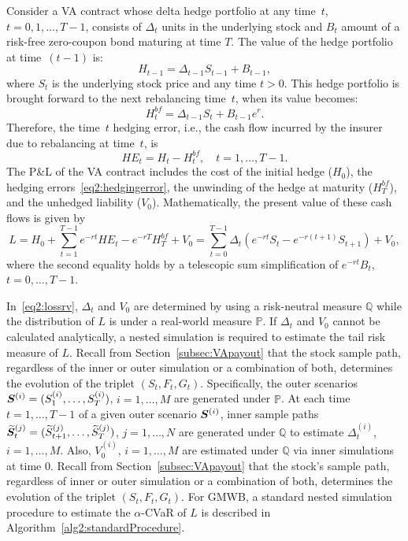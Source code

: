 Consider a VA contract whose delta hedge portfolio at any time~$t$, $t=0,1,\ldots,T-1$, consists of $\Delta_t$ units in the underlying stock and $B_t$ amount of a risk-free zero-coupon bond maturing at time $T$.
The value of the hedge portfolio at time~$(t-1)$ is:
\begin{equation*}
    H_{t-1} = \Delta_{t-1} S_{t-1} + B_{t-1},
\end{equation*}
where $S_t$ is the underlying stock price and any time $t>0$.
This hedge portfolio is brought forward to the next rebalancing time~$t$, when its value becomes:
\begin{equation*}
    H_{t}^{bf} = \Delta_{t-1} S_{t} + B_{t-1}e^{r}.
\end{equation*}
Therefore, the time~$t$ hedging error, i.e., the cash flow incurred by the insurer due to rebalancing at time~$t$, is
\begin{equation}\label{eq2:hedgingerror}
    HE_t = H_t - H^{bf}_t, \quad t=1,\ldots, T-1.
\end{equation}
The P\&L of the VA contract includes the cost of the initial hedge ($H_0$), the hedging errors~\eqref{eq2:hedgingerror}, the unwinding of the hedge at maturity ($H^{bf}_T$), and the unhedged liability ($V_0$).
Mathematically, the present value of these cash flows is given by
\begin{equation}\label{eq2:lossrv}
L = H_0 + \sum_{t=1}^{T-1} e^{-rt} HE_t - e^{-rT} H^{bf}_T + V_0 = \sum_{t=0}^{T-1}\Delta_t (e^{-rt}S_t - e^{-r(t+1)}S_{t+1}) + V_0,
\end{equation}
where the second equality holds by a telescopic sum simplification of $e^{-rt}B_t$, $t=0,\ldots,T-1$.

In~\eqref{eq2:lossrv}, $\Delta_t$ and $V_0$ are determined by using a risk-neutral measure $\mathbb{Q}$ while the distribution of $L$ is under a real-world measure $\mathbb{P}$.
If $\Delta_t$ and $V_0$ cannot be calculated analytically, a nested simulation is required to estimate the tail risk measure of $L$.
Recall from Section~\ref{subsec:VApayout} that the stock sample path, regardless of the inner or outer simulation or a combination of both, determines the evolution of the triplet $(S_t,F_t,G_t)$.
Specifically, the outer scenarios $\bm{S}^{(i)} = (S_{1}^{(i)},\ldots,S_{T}^{(i)})$, $i=1,\ldots,M$ are generated under $\mathbb{P}$.
At each time~$t=1,\ldots,T-1$ of a given outer scenario $\bm{S}^{(i)}$, inner sample paths $\widetilde{\bm{S}}_{t}^{(j)} = (\widetilde{S}_{t+1}^{(j)},\ldots,\widetilde{S}_{T}^{(j)})$, $j=1,\ldots,N$ are generated under $\mathbb{Q}$ to estimate $\Delta_t^{(i)}$, $i=1,\ldots,M$.
Also, $V_0^{(i)}$, $i=1,\ldots,M$ are estimated under $\mathbb{Q}$ via inner simulations at time $0$.
Recall from Section~\ref{subsec:VApayout} that the stock's sample path, regardless of inner or outer simulation or a combination of both, determines the evolution of the triplet $(S_t,F_t,G_t)$.
For GMWB, a standard nested simulation procedure to estimate the $\alpha$-CVaR of $L$ is described in Algorithm~\ref{alg2:standardProcedure}.

